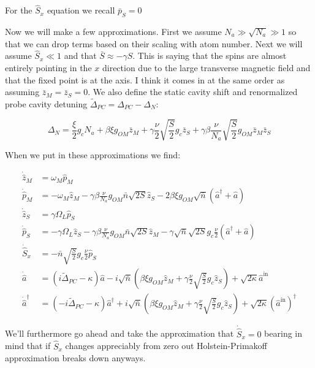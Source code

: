 \documentclass[12pt]{article}
\begin{document}
For the $\hat{S}_x$ equation we recall $\bar{p}_S = 0$

Now we will make a few approximations. First we assume $N_a \gg \sqrt{N_a} \gg 1$ so that we can drop terms based on their scaling with atom number. Next we will assume $\hat{S}_x \ll 1$ and that $\bar{S} \approx -\gamma S$. This is saying that the spins are almost entirely pointing in the $x$ direction due to the large transverse magnetic field and that the fixed point is at the axis. I think it comes in at the same order as assuming $\bar{z}_M = \bar{z}_S = 0$.
We also define the static cavity shift and renormalized probe cavity detuning $\tilde{\Delta}_{PC} = \Delta_{PC} -\Delta_N$:

\begin{equation}
\Delta_N = \frac{\xi}{2} g_c N_a + \beta \xi g_{OM} \bar{z}_M + \gamma \frac{\nu}{2} \sqrt{\frac{S}{2}} g_c \bar{z}_S + \gamma \beta \frac{\nu}{N_a} \sqrt{\frac{S}{2}} g_{OM} \bar{z}_M \bar{z}_S
\end{equation}

When we put in these approximations we find:

\begin{align*}
\dot{\hat{z}}_M & = \omega_M \hat{p}_M \\
\dot{\hat{p}}_M & = -\omega_M \hat{z}_M - \gamma \beta \frac{\nu}{N_a} g_{OM} \bar{n} \sqrt{2S} \hat{z}_S - 2 \beta \xi g_{OM} \sqrt{\bar{n}} (\hat{a}^{\dag} + \hat{a})\\
\dot{\hat{z}}_S & = \gamma \Omega_L \hat{p}_S \\
\dot{\hat{p}}_S & = -\gamma \Omega_L \hat{z}_S - \gamma \beta\frac{\nu}{N_a} g_{OM} \bar{n} \sqrt{2S} \hat{z}_M - \gamma  \sqrt{\bar{n}} \sqrt{2S} g_c \frac{\nu}{2} (\hat{a}^{\dag} + \hat{a}) \\
\dot{\hat{S}}_x & = - \bar{n} \sqrt{\frac{S}{2}} g_c \frac{\nu}{2}  \hat{p}_S \\
\dot{\hat{a}} & =  \left( i \tilde{\Delta}_{PC} - \kappa   \right)\hat{a} - i \sqrt{\bar{n}} \left( \beta \xi g_{OM} \hat{z}_M + \gamma \frac{\nu}{2} \sqrt{\frac{S}{2}} g_c \hat{z}_S \right) + \sqrt{2 \kappa} \hat{a}^{\text{in}}\\
\dot{\hat{a}}^{\dag} & =  \left( -i \tilde{\Delta}_{PC} - \kappa   \right)\hat{a}^{\dag} + i \sqrt{\bar{n}} \left( \beta \xi g_{OM} \hat{z}_M + \gamma \frac{\nu}{2} \sqrt{\frac{S}{2}} g_c \hat{z}_S \right) + \sqrt{2 \kappa} (\hat{a}^{\text{in}})^{\dag}
\end{align*}

We'll furthermore go ahead and take the approximation that $\dot{\hat{S}}_x = 0$ bearing in mind that if $\hat{S}_x$ changes appreciably from zero out Holstein-Primakoff approximation breaks down anyways.
\end{document}
